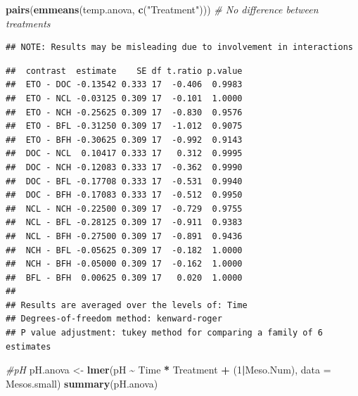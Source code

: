 \documentclass[
]{article}
\newenvironment{Shaded}{\begin{snugshade}}{\end{snugshade}}
\newcommand{\AttributeTok}[1]{\textcolor[rgb]{0.13,0.29,0.53}{#1}}
\newcommand{\CommentTok}[1]{\textcolor[rgb]{0.56,0.35,0.01}{\textit{#1}}}
\newcommand{\DecValTok}[1]{\textcolor[rgb]{0.00,0.00,0.81}{#1}}
\newcommand{\FunctionTok}[1]{\textcolor[rgb]{0.13,0.29,0.53}{\textbf{#1}}}
\newcommand{\NormalTok}[1]{#1}
\newcommand{\OtherTok}[1]{\textcolor[rgb]{0.56,0.35,0.01}{#1}}
\newcommand{\SpecialCharTok}[1]{\textcolor[rgb]{0.81,0.36,0.00}{\textbf{#1}}}
\newcommand{\StringTok}[1]{\textcolor[rgb]{0.31,0.60,0.02}{#1}}
\begin{document}
\begin{Shaded}
\begin{Highlighting}[]
\FunctionTok{pairs}\NormalTok{(}\FunctionTok{emmeans}\NormalTok{(temp.anova, }\FunctionTok{c}\NormalTok{(}\StringTok{"Treatment"}\NormalTok{))) }\CommentTok{\# No difference between treatments}
\end{Highlighting}
\end{Shaded}

\begin{verbatim}
## NOTE: Results may be misleading due to involvement in interactions
\end{verbatim}

\begin{verbatim}
##  contrast  estimate    SE df t.ratio p.value
##  ETO - DOC -0.13542 0.333 17  -0.406  0.9983
##  ETO - NCL -0.03125 0.309 17  -0.101  1.0000
##  ETO - NCH -0.25625 0.309 17  -0.830  0.9576
##  ETO - BFL -0.31250 0.309 17  -1.012  0.9075
##  ETO - BFH -0.30625 0.309 17  -0.992  0.9143
##  DOC - NCL  0.10417 0.333 17   0.312  0.9995
##  DOC - NCH -0.12083 0.333 17  -0.362  0.9990
##  DOC - BFL -0.17708 0.333 17  -0.531  0.9940
##  DOC - BFH -0.17083 0.333 17  -0.512  0.9950
##  NCL - NCH -0.22500 0.309 17  -0.729  0.9755
##  NCL - BFL -0.28125 0.309 17  -0.911  0.9383
##  NCL - BFH -0.27500 0.309 17  -0.891  0.9436
##  NCH - BFL -0.05625 0.309 17  -0.182  1.0000
##  NCH - BFH -0.05000 0.309 17  -0.162  1.0000
##  BFL - BFH  0.00625 0.309 17   0.020  1.0000
## 
## Results are averaged over the levels of: Time 
## Degrees-of-freedom method: kenward-roger 
## P value adjustment: tukey method for comparing a family of 6 estimates
\end{verbatim}

\begin{Shaded}
\begin{Highlighting}[]
\CommentTok{\#pH}
\NormalTok{pH.anova }\OtherTok{\textless{}{-}} \FunctionTok{lmer}\NormalTok{(pH }\SpecialCharTok{\textasciitilde{}}\NormalTok{ Time }\SpecialCharTok{*}\NormalTok{ Treatment }\SpecialCharTok{+}\NormalTok{ (}\DecValTok{1}\SpecialCharTok{|}\NormalTok{Meso.Num), }\AttributeTok{data =}\NormalTok{ Mesos.small)}
\FunctionTok{summary}\NormalTok{(pH.anova)}
\end{Highlighting}
\end{Shaded}
\end{document}
